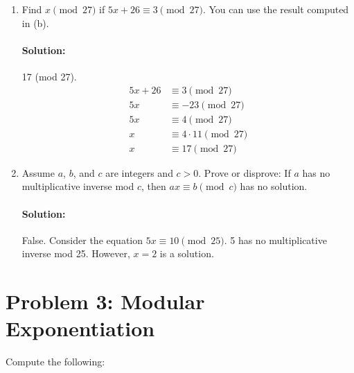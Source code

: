 \documentclass[11pt, notitlepage]{report}
\newcommand{\Question}[1]{\newpage\section{#1}}
\newenvironment{solution}{\paragraph{Solution:}}{\hfill}
\begin{document}
\begin{enumerate}[label=(\alph*)]
    \item Find $x \pmod{27}$ if $5x + 2 6 \equiv 3 \pmod{27}$. You can use the result computed in (b).
	\begin{solution} 17 (mod 27).
	\begin{align*}
		5x + 2 6 &\equiv 3 	 \pmod{27} \\
		5x &\equiv -23 		 \pmod{27} \\
		5x &\equiv 4 		 \pmod{27} \\
		 x &\equiv 4\cdot 11 \pmod{27} \\
		 x &\equiv 17 		 \pmod{27}
	\end{align*}
	\end{solution}
    \item Assume $a$, $b$, and $c$ are integers and $c>0$. Prove or disprove: If $a$ has no multiplicative inverse mod $c$, then $ax \equiv b \pmod{c}$ has no solution.
   	\begin{solution}
   		False. Consider the equation $5x \equiv 10 \pmod{25}$. 5 has no multiplicative inverse mod 25. However, $x=2$ is a solution.
   	\end{solution}

\end{enumerate}


\Question{Problem 3: Modular Exponentiation}

Compute the following:
\end{document}
